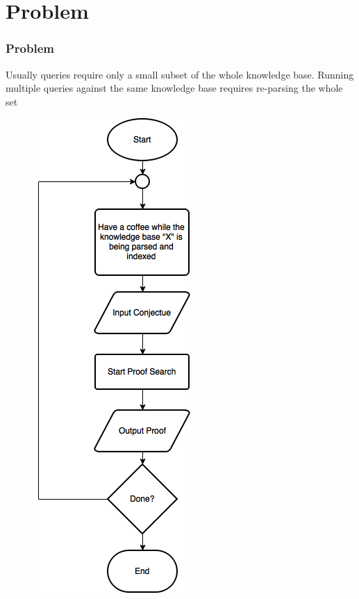 \documentclass[10pt]{beamer}
\begin{document}
\section{Problem}
\begin{frame}[fragile]
  \frametitle{Problem}
  Usually queries require only a small subset of the whole knowledge base. Running multiple queries against the same knowledge base requires re-parsing the whole set
\begin{figure} \includegraphics[width=\linewidth,height=0.8\textheight,keepaspectratio]{imgs/OldDeductionFC.png} \end{figure}
\end{frame}
\end{document}
